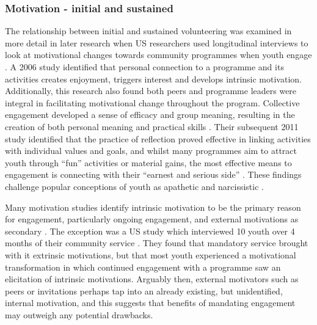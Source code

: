 \subsubsection{Motivation - initial and sustained}

The relationship between initial and sustained volunteering was examined in more detail in later research when US researchers used longitudinal interviews to look at motivational changes towards community programmes when youth engage \citep{Pearce2006, Dawes2011}. A 2006 study identified that personal connection to a programme and its activities creates enjoyment, triggers interest and develops intrinsic motivation. Additionally, this research also found both peers and programme leaders were integral in facilitating motivational change throughout the program. Collective engagement developed a sense of efficacy and group meaning, resulting in the creation of both personal meaning and practical skills \citep{Pearce2006}. Their subsequent 2011 study identified that the practice of reflection proved effective in linking activities with individual values and goals, and whilst many programmes aim to attract youth through “fun” activities or material gains, the most effective means to engagement is connecting with their “earnest and serious side” \citep[][p266]{Dawes2011}. These findings challenge popular conceptions of youth as apathetic and narcissistic \citep{Nelson2014}.

Many motivation studies identify intrinsic motivation to be the primary reason for engagement, particularly ongoing engagement, and external motivations as secondary \citep{Dawes2011, Ballard2014, Eccles2002, Eccles2009}. The exception was a US study which interviewed 10 youth over 4 months of their community service \citep{Pearce2006}. They found that mandatory service brought with it extrinsic motivations, but that most youth experienced a motivational transformation in which continued engagement with a programme saw an elicitation of intrinsic motivations. Arguably then, external motivators such as peers \citep{Youniss2001,Wilkenfeld2009} or invitations \citep{Marzana2012} perhaps tap into an already existing, but unidentified, internal motivation, and this suggests that benefits of mandating engagement may outweigh any potential drawbacks. 


